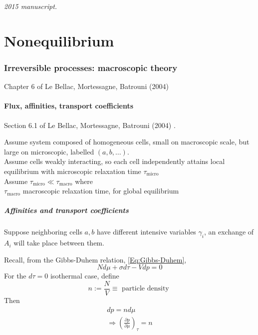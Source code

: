 \noindent\textit{2015 manuscript.}

\part{Nonequilibrium}

\section{Irreversible processes: macroscopic theory}

Chapter 6 of Le Bellac, Mortessagne, Batrouni (2004) \cite{MLeBellacFMortessagneGBatrouni2004}

\subsection{Flux, affinities, transport coefficients}

Section 6.1 of Le Bellac, Mortessagne, Batrouni (2004) \cite{MLeBellacFMortessagneGBatrouni2004}. 

Assume system composed of homogeneous cells, small on macroscopic scale, but large on microscopic, labelled $(a,b,\dots )$.  \\
Assume cells weakly interacting, so each cell independently attains local equilibrium with microscopic relaxation time $\tau_{\text{micro}}$ \\
Assume $\tau_{\text{micro}} \ll \tau_{\text{macro}}$ where \\
\phantom{Assume } $\tau_{\text{macro}}$ macroscopic relaxation time, for global equilibrium 










\subsubsection{Affinities and transport coefficients}

Suppose neighboring cells $a,b$ have different intensive variables $\gamma_i$, an exchange of $A_i$ will take place between them.








Recall, from the Gibbs-Duhem relation, \ref{Eq:Gibbs-Duhem},
\[
N d\mu + \sigma d\tau -Vdp = 0 
\]
For the $d\tau =0$ isothermal case, define
\begin{equation}
n := \frac{N}{V} \equiv \text{ particle density }
\end{equation}
Then 
\begin{equation}
\begin{gathered}
  dp = n d\mu \\ 
  \Longrightarrow \boxed{ \left( \frac{ \partial p }{ \partial \mu } \right)_{\tau} = n }
\end{gathered}
\end{equation}


